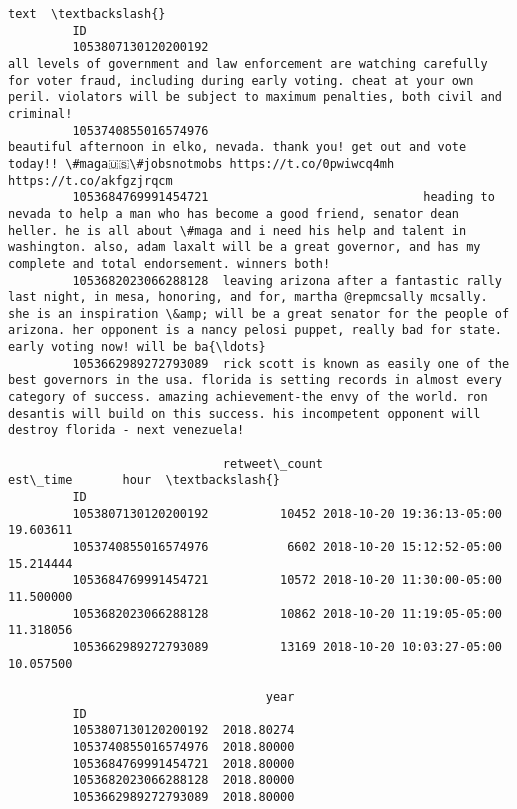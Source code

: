 \documentclass[11pt]{article}
\begin{document}
\begin{Verbatim}[commandchars=\\\{\}]
                                                                                                                                                                                                                                                                                                                 text  \textbackslash{}
         ID                                                                                                                                                                                                                                                                                                             
         1053807130120200192                                                                    all levels of government and law enforcement are watching carefully for voter fraud, including during early voting. cheat at your own peril. violators will be subject to maximum penalties, both civil and criminal!   
         1053740855016574976                                                                                                                                             beautiful afternoon in elko, nevada. thank you! get out and vote today!! \#maga🇺🇸\#jobsnotmobs https://t.co/0pwiwcq4mh https://t.co/akfgzjrqcm   
         1053684769991454721                              heading to nevada to help a man who has become a good friend, senator dean heller. he is all about \#maga and i need his help and talent in washington. also, adam laxalt will be a great governor, and has my complete and total endorsement. winners both!   
         1053682023066288128  leaving arizona after a fantastic rally last night, in mesa, honoring, and for, martha @repmcsally mcsally. she is an inspiration \&amp; will be a great senator for the people of arizona. her opponent is a nancy pelosi puppet, really bad for state. early voting now! will be ba{\ldots}   
         1053662989272793089  rick scott is known as easily one of the best governors in the usa. florida is setting records in almost every category of success. amazing achievement-the envy of the world. ron desantis will build on this success. his incompetent opponent will destroy florida - next venezuela!   
         
                              retweet\_count                  est\_time       hour  \textbackslash{}
         ID                                                                        
         1053807130120200192          10452 2018-10-20 19:36:13-05:00  19.603611   
         1053740855016574976           6602 2018-10-20 15:12:52-05:00  15.214444   
         1053684769991454721          10572 2018-10-20 11:30:00-05:00  11.500000   
         1053682023066288128          10862 2018-10-20 11:19:05-05:00  11.318056   
         1053662989272793089          13169 2018-10-20 10:03:27-05:00  10.057500   
         
                                    year  
         ID                               
         1053807130120200192  2018.80274  
         1053740855016574976  2018.80000  
         1053684769991454721  2018.80000  
         1053682023066288128  2018.80000  
         1053662989272793089  2018.80000  
\end{Verbatim}
            
\end{document}
